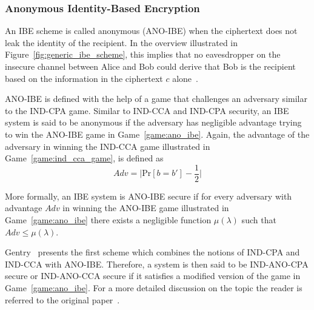 \subsubsection{Anonymous Identity-Based Encryption}
An IBE scheme is called anonymous (ANO-IBE) when the ciphertext does not leak the identity of the recipient. In the overview illustrated in Figure~\ref{fig:generic_ibe_scheme}, this implies that no eavesdropper on the insecure channel between Alice and Bob could derive that Bob is the recipient based on the information in the ciphertext $c$ alone~\cite{art:BoyenW06}.

ANO-IBE is defined with the help of a game that challenges an adversary similar to the IND-CPA game. Similar to IND-CCA and IND-CPA security, an IBE system is said to be anonymous if the adversary has negligible advantage trying to win the ANO-IBE game in Game~\ref{game:ano_ibe}. Again, the advantage of the adversary in winning the IND-CCA game illustrated in Game~\ref{game:ind_cca_game}, is defined as
\begin{equation*}
 Adv = \lvert \textrm{Pr} \left[ b = b' \right] - \frac{1}{2} \rvert
\end{equation*}

More formally, an IBE system is ANO-IBE secure if for every adversary with advantage $Adv$ in winning the ANO-IBE game illustrated in Game~\ref{game:ano_ibe} there exists a negligible function $\mu \left( \lambda \right)$ such that $Adv \leq \mu \left( \lambda \right)$.

Gentry~\cite{art:Gentry06} presents the first scheme which combines the notions of IND-CPA and IND-CCA with ANO-IBE. Therefore, a system is then said to be IND-ANO-CPA secure or IND-ANO-CCA secure if it satisfies a modified version of the game in Game~\ref{game:ano_ibe}. For a more detailed discussion on the topic the reader is referred to the original paper~\cite{art:Gentry06}.

